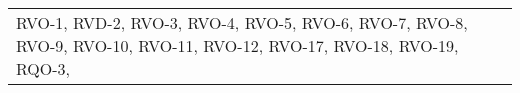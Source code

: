 \begin{xltabular}{\textwidth}{|X| X |}
                RVO-1, \newline 
                RVD-2, \newline
                RVO-3, \newline
                RVO-4, \newline
                RVO-5, \newline
                RVO-6, \newline
                RVO-7, \newline
                RVO-8, \newline
                RVO-9, \newline
                RVO-10, \newline
                RVO-11, \newline
                RVO-12, \newline
                RVO-17, \newline
                RVO-18, \newline
                RVO-19, \newline
                RQO-3, \newline
               

\end{xltabular}
